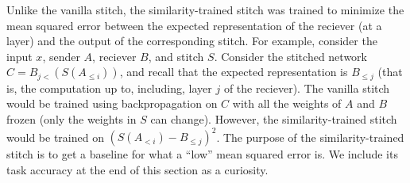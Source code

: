 \documentclass{article}
\begin{document}
Unlike the vanilla stitch, the similarity-trained stitch was trained to minimize the mean squared error between
the expected representation of the reciever (at a layer) and the output of the corresponding stitch. For example,
consider the input $x$, sender $A$, reciever $B$, and stitch $S$. Consider the stitched
network $C = B_{j<}(S(A_{\leq i}))$, and recall that the expected representation is $B_{\leq j}$ (that is, the computation
up to, including, layer $j$ of the reciever). The vanilla stitch would be trained using backpropagation on $C$ with
all the weights of $A$ and $B$ frozen (only the weights in $S$ can change). However, the similarity-trained stitch
would be trained on $(S(A_{<i}) - B_{\leq j})^2$. The purpose of the similarity-trained stitch is to get a baseline for
what a ``low'' mean squared error is. We include its task accuracy at the end of this section as a curiosity.
\end{document}

